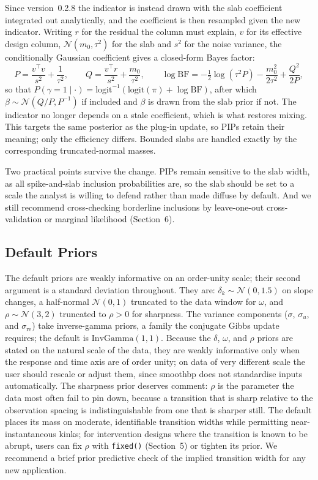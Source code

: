\documentclass[12pt]{article}
\newcommand{\pkg}[1]{\textsf{#1}}
\newcommand{\code}[1]{\texttt{#1}}
\begin{document}
Since version~0.2.8 the indicator is instead drawn with the slab coefficient integrated out analytically, and the coefficient is then resampled given the new indicator. Writing $r$ for the residual the column must explain, $v$ for its effective design column, $\mathcal{N}(m_0, \tau^2)$ for the slab and $s^2$ for the noise variance, the conditionally Gaussian coefficient gives a closed-form Bayes factor:
\begin{equation*}
P = \frac{v^\top v}{s^2} + \frac{1}{\tau^2}, \qquad
Q = \frac{v^\top r}{s^2} + \frac{m_0}{\tau^2}, \qquad
\log \mathrm{BF} = -\tfrac{1}{2}\log(\tau^2 P) - \frac{m_0^2}{2\tau^2} + \frac{Q^2}{2P},
\end{equation*}
so that $P(\gamma = 1 \mid \cdot) = \mathrm{logit}^{-1}\!\left(\mathrm{logit}(\pi) + \log \mathrm{BF}\right)$, after which $\beta \sim \mathcal{N}(Q/P, P^{-1})$ if included and $\beta$ is drawn from the slab prior if not. The indicator no longer depends on a stale coefficient, which is what restores mixing. This targets the same posterior as the plug-in update, so PIPs retain their meaning; only the efficiency differs. Bounded slabs are handled exactly by the corresponding truncated-normal masses.

Two practical points survive the change. PIPs remain sensitive to the slab width, as all spike-and-slab inclusion probabilities are, so the slab should be set to a scale the analyst is willing to defend rather than made diffuse by default. And we still recommend cross-checking borderline inclusions by leave-one-out cross-validation or marginal likelihood (Section~6).

\subsection{Default Priors}

The default priors are weakly informative on an order-unity scale; their second argument is a standard deviation throughout. They are: $\delta_k \sim \mathcal{N}(0, 1.5)$ on slope changes, a half-normal $\mathcal{N}(0, 1)$ truncated to the data window for $\omega$, and $\rho \sim \mathcal{N}(3, 2)$ truncated to $\rho > 0$ for sharpness. The variance components ($\sigma$, $\sigma_u$, and $\sigma_{\mathrm{re}}$) take inverse-gamma priors, a family the conjugate Gibbs update requires; the default is $\mathrm{InvGamma}(1, 1)$. Because the $\delta$, $\omega$, and $\rho$ priors are stated on the natural scale of the data, they are weakly informative only when the response and time axis are of order unity; on data of very different scale the user should rescale or adjust them, since \pkg{smoothbp} does not standardise inputs automatically. The sharpness prior deserves comment: $\rho$ is the parameter the data most often fail to pin down, because a transition that is sharp relative to the observation spacing is indistinguishable from one that is sharper still. The default places its mass on moderate, identifiable transition widths while permitting near-instantaneous kinks; for intervention designs where the transition is known to be abrupt, users can fix $\rho$ with \code{fixed()} (Section~5) or tighten its prior. We recommend a brief prior predictive check of the implied transition width for any new application.
\end{document}
